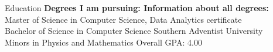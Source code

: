 \begin{rSection}{Education}
  {\bf\small Degrees I am pursuing: \hfill \bf Information about all degrees:}\\
	Master of Science in Computer Science, Data Analytics certificate \hfill {}\\
	Bachelor of Science in Computer Science \hfill {Southern Adventist University}\\
	Minors in Physics and Mathematics \hfill {Overall GPA: 4.00}
\end{rSection}